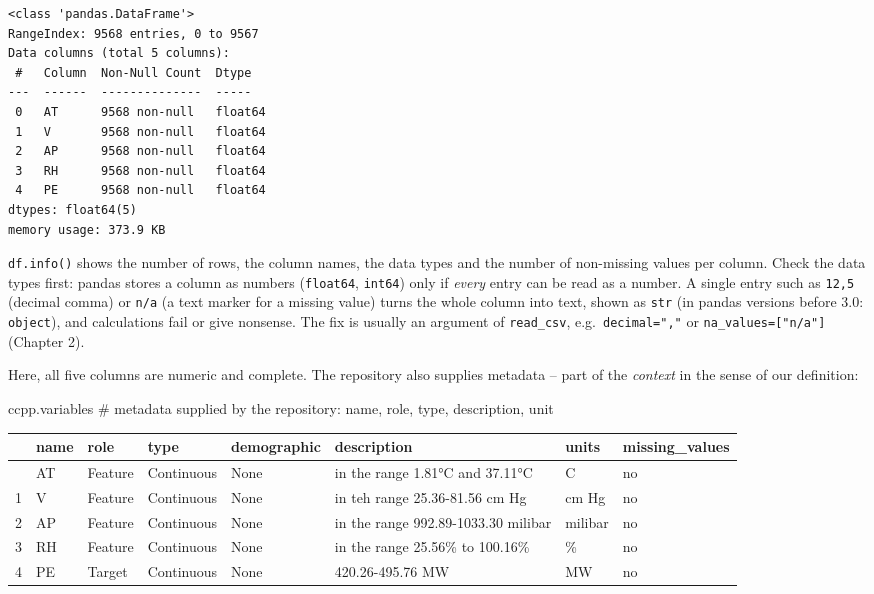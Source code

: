 \documentclass[
  letterpaper,
  DIV=11,
  numbers=noendperiod]{scrreprt}
\newenvironment{Shaded}{\begin{snugshade}}{\end{snugshade}}
\newcommand{\CommentTok}[1]{\textcolor[rgb]{0.37,0.37,0.37}{#1}}
\newcommand{\NormalTok}[1]{\textcolor[rgb]{0.00,0.23,0.31}{#1}}
\begin{document}
\begin{verbatim}
<class 'pandas.DataFrame'>
RangeIndex: 9568 entries, 0 to 9567
Data columns (total 5 columns):
 #   Column  Non-Null Count  Dtype  
---  ------  --------------  -----  
 0   AT      9568 non-null   float64
 1   V       9568 non-null   float64
 2   AP      9568 non-null   float64
 3   RH      9568 non-null   float64
 4   PE      9568 non-null   float64
dtypes: float64(5)
memory usage: 373.9 KB
\end{verbatim}

\texttt{df.info()} shows the number of rows, the column names, the data
types and the number of non-missing values per column. Check the data
types first: pandas stores a column as numbers (\texttt{float64},
\texttt{int64}) only if \emph{every} entry can be read as a number. A
single entry such as \texttt{12,5} (decimal comma) or \texttt{n/a} (a
text marker for a missing value) turns the whole column into text, shown
as \texttt{str} (in pandas versions before 3.0: \texttt{object}), and
calculations fail or give nonsense. The fix is usually an argument of
\texttt{read\_csv}, e.g.~\texttt{decimal=","} or
\texttt{na\_values={[}"n/a"{]}} (Chapter 2).

Here, all five columns are numeric and complete. The repository also
supplies metadata -- part of the \emph{context} in the sense of our
definition:

\begin{Shaded}
\begin{Highlighting}[]
\NormalTok{ccpp.variables   }\CommentTok{\# metadata supplied by the repository: name, role, type, description, unit}
\end{Highlighting}
\end{Shaded}

\begin{longtable}[]{@{}llllllll@{}}
\toprule\noalign{}
& name & role & type & demographic & description & units &
missing\_values \\
\midrule\noalign{}
\endhead
\bottomrule\noalign{}
\endlastfoot
0 & AT & Feature & Continuous & None & in the range 1.81°C and 37.11°C &
C & no \\
1 & V & Feature & Continuous & None & in teh range 25.36-81.56 cm Hg &
cm Hg & no \\
2 & AP & Feature & Continuous & None & in the range 992.89-1033.30
milibar & milibar & no \\
3 & RH & Feature & Continuous & None & in the range 25.56\% to 100.16\%
& \% & no \\
4 & PE & Target & Continuous & None & 420.26-495.76 MW & MW & no \\
\end{longtable}
\end{document}
